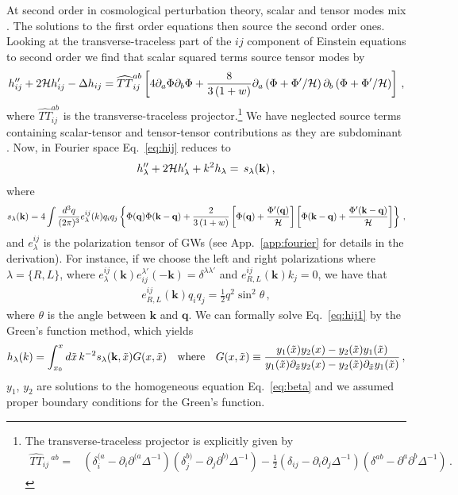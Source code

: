 \documentclass[aps,10pt,prd,groupedaddress,nofootinbib,notitlepage,eqsecnum,preprintnumbers]{revtex4-1}
\begin{document}
At second order in cosmological perturbation theory, scalar and tensor modes mix \cite{Noh:2004bc}. The solutions to the first order equations then source the second order ones. Looking at the transverse-traceless part of the $ij$ component of Einstein equations to second order we find that scalar squared terms source tensor modes by \cite{Baumann:2007zm,Domenech:2017ems}
\begin{align}\label{eq:hij}
h_{ij}''+2{\cal H}h_{ij}'-\Delta h_{ij}=\widehat{TT}^{ab}_{ij}\left[4\partial_a\Phi\partial_b\Phi+\frac{8}{3\left(1+w\right)}\partial_a\left(\Phi+\Phi'/{\cal H}\right)\partial_b\left(\Phi+\Phi'/{\cal H}\right)\right]\,,
\end{align}
where $\widehat{TT}^{ab}_{ij}$ is the transverse-traceless projector.\footnote{The transverse-traceless projector is explicitly given by
\begin{align}
\widehat{TT}_{ij}\,^{ab}=&\left(\delta_{i}^{(a}-\partial_i\partial^{(a}\Delta^{-1}\right)\left(\delta_j^{b)}-\partial_j\partial^{b)}\Delta^{-1}\right)-\frac{1}{2}\left(\delta_{ij}-\partial_i\partial_j\Delta^{-1}\right)\left(\delta^{ab}-\partial^a\partial^b\Delta^{-1}\right)\nonumber\,.
\end{align}
} We have neglected source terms containing scalar-tensor and tensor-tensor contributions as they are subdominant \cite{Gong:2019mui}.
 Now, in Fourier space Eq.~\eqref{eq:hij} reduces to
\begin{align}\label{eq:hij1}
h_{\lambda}''+2{\cal H}h_{\lambda}'+k^2h_{\lambda}=\,s_\lambda(\mathbf{k})\,,
\end{align}
where
\begin{align}
s_\lambda(\mathbf{k})=4\int \frac{d^3q}{(2\pi)^3}e_\lambda^{ij}(k)q_iq_j\left\{\Phi(\mathbf{q})\Phi(\mathbf{k}-\mathbf{q})+\frac{2}{3\left(1+w\right)}\left[\Phi(\mathbf{q})+\frac{\Phi'(\mathbf{q})}{\cal H}\right]\left[\Phi(\mathbf{k}-\mathbf{q})+\frac{\Phi'(\mathbf{k}-\mathbf{q})}{\cal H}\right]\right\}\,,
\end{align}
and $e_{\lambda}^{ij}$ is the polarization tensor of GWs (see App.~\ref{app:fourier} for details in the derivation). For instance, if we choose the left and right polarizations where $\lambda=\{R,L\}$, where
 $e_\lambda^{ij}(\mathbf{k})e^{\lambda'}_{ij}(-\mathbf{k})=\delta^{\lambda\lambda'}$ and $e_{R,L}^{ij}(\mathbf{k})k_j=0$, we have that
\begin{align}
e_{R,L}^{ij}(\mathbf{k})q_iq_j=\frac{1}{2}q^2\sin^2\theta\,,
\end{align}
where $\theta$ is the angle between $\mathbf{k}$ and $\mathbf{q}$. We can formally solve Eq.~\eqref{eq:hij1} by the Green's function method, which yields \cite{Baumann:2007zm}
\begin{align}
h_\lambda(k)=\int_{x_0}^x d\tilde x \,k^{-2}s_\lambda(\mathbf{k},\tilde x)G(x,\tilde x)
\quad{\rm where}
\quad
G(x,\tilde x)\equiv\frac{y_1(\tilde x)y_2(x)-y_2(\tilde x)y_1(\tilde x)}{y_1(\tilde x)\partial_{\tilde x}y_2(x)-y_2(\tilde x)\partial_{\tilde x}y_1(\tilde x)}\,,
\end{align}
$y_1$, $y_2$ are solutions to the homogeneous equation Eq.~\eqref{eq:beta}
and we assumed proper boundary conditions for the Green's function.
\end{document}
